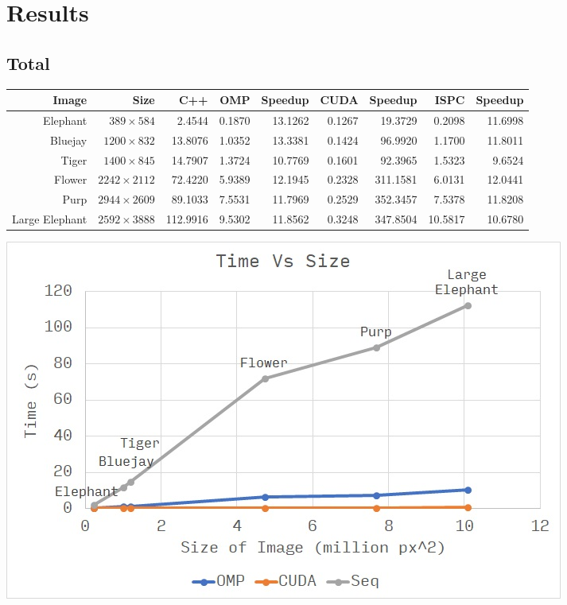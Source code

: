 \documentclass[12pt]{article}
\begin{document}
\section{Results}

\subsection{Total}
\begin{tabular}{r|r|r|r|r|r|r|r|r}
    Image & Size & C++ & OMP & Speedup & CUDA & Speedup & ISPC & Speedup
\\  \hline
    Elephant & $389 \times 584$ & 2.4544 & 0.1870 & 13.1262 & 0.1267 & 19.3729 & 0.2098 & 11.6998
\\  Bluejay & $1200 \times 832$ & 13.8076 & 1.0352 & 13.3381 & 0.1424 & 96.9920 & 1.1700 & 11.8011
\\  Tiger & $1400 \times 845$ & 14.7907 & 1.3724 & 10.7769 & 0.1601 & 92.3965 & 1.5323 & 9.6524
\\  Flower & $2242 \times 2112$ & 72.4220 & 5.9389 & 12.1945 & 0.2328 & 311.1581 & 6.0131 & 12.0441
\\  Purp & $2944 \times 2609$ & 89.1033 & 7.5531 & 11.7969 & 0.2529 & 352.3457 & 7.5378 & 11.8208
\\  Large Elephant & $2592 \times 3888$ & 112.9916 & 9.5302 & 11.8562 & 0.3248 & 347.8504 & 10.5817 & 10.6780
\end{tabular}

\begin{center}
\includegraphics[scale=1]{time.jpg}
\end{center}
\end{document}

